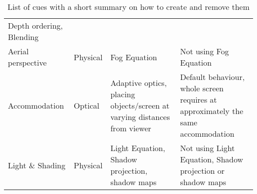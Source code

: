 \begin{table*}[p]
\begin{center}
\begin{tabular}{p{2cm}|p{1.9cm}|p{5cm}|p{5cm}}
Depth ordering, Blending \\
Aerial perspective &
Physical &
Fog Equation &
Not using Fog Equation \\
Accom\-modation &
Optical &
Adaptive optics, placing objects/screen at varying distances from viewer &
Default behaviour, whole screen requires at approximately the same accommodation \\
Light \& Shading &
Physical &
Light Equation, Shadow projection, shadow maps &
Not using Light Equation, Shadow projection or shadow maps
\end{tabular}
\end{center}
\caption{List of cues with a short summary on how to create and remove them}
\label{DepthCuesTable}
\end{table*}

